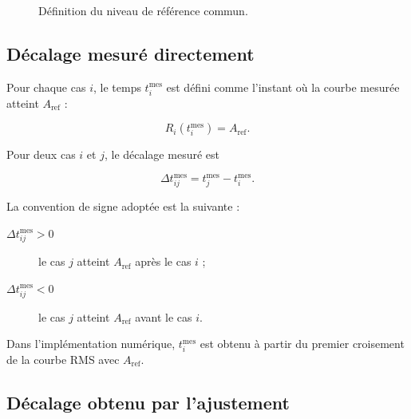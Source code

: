 \documentclass[
    11pt,
    a4paper
]{article}
\begin{document}
\begin{figure}[H]
    \centering
    \caption{Définition du niveau de référence commun.}
    \label{fig:niveau-reference}
\end{figure}

\subsection{Décalage mesuré directement}
\label{subsec:decalage-mesure}

Pour chaque cas \(i\), le temps \(t_i^{\mathrm{mes}}\) est défini comme
l'instant où la courbe mesurée atteint \(A_{\mathrm{ref}}\) :

\begin{equation}
    R_i\!\left(t_i^{\mathrm{mes}}\right)
    =
    A_{\mathrm{ref}}.
    \label{eq:temps-mesure}
\end{equation}

Pour deux cas \(i\) et \(j\), le décalage mesuré est

\begin{equation}
    \Delta t_{ij}^{\mathrm{mes}}
    =
    t_j^{\mathrm{mes}}
    -
    t_i^{\mathrm{mes}}.
    \label{eq:decalage-mesure}
\end{equation}

La convention de signe adoptée est la suivante :

\begin{description}
    \item[\(\Delta t_{ij}^{\mathrm{mes}}>0\)] le cas \(j\) atteint
    \(A_{\mathrm{ref}}\) après le cas \(i\) ;
    \item[\(\Delta t_{ij}^{\mathrm{mes}}<0\)] le cas \(j\) atteint
    \(A_{\mathrm{ref}}\) avant le cas \(i\).
\end{description}

Dans l'implémentation numérique, \(t_i^{\mathrm{mes}}\) est obtenu à partir du
premier croisement de la courbe RMS avec \(A_{\mathrm{ref}}\).


\subsection{Décalage obtenu par l’ajustement}
\label{subsec:decalage-fit}
\end{document}
